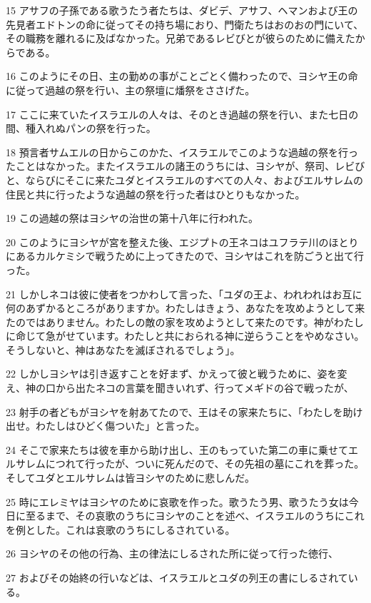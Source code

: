 \par 15 アサフの子孫である歌うたう者たちは、ダビデ、アサフ、ヘマンおよび王の先見者エドトンの命に従ってその持ち場におり、門衛たちはおのおの門にいて、その職務を離れるに及ばなかった。兄弟であるレビびとが彼らのために備えたからである。
\par 16 このようにその日、主の勤めの事がことごとく備わったので、ヨシヤ王の命に従って過越の祭を行い、主の祭壇に燔祭をささげた。
\par 17 ここに来ていたイスラエルの人々は、そのとき過越の祭を行い、また七日の間、種入れぬパンの祭を行った。
\par 18 預言者サムエルの日からこのかた、イスラエルでこのような過越の祭を行ったことはなかった。またイスラエルの諸王のうちには、ヨシヤが、祭司、レビびと、ならびにそこに来たユダとイスラエルのすべての人々、およびエルサレムの住民と共に行ったような過越の祭を行った者はひとりもなかった。
\par 19 この過越の祭はヨシヤの治世の第十八年に行われた。
\par 20 このようにヨシヤが宮を整えた後、エジプトの王ネコはユフラテ川のほとりにあるカルケミシで戦うために上ってきたので、ヨシヤはこれを防ごうと出て行った。
\par 21 しかしネコは彼に使者をつかわして言った、「ユダの王よ、われわれはお互に何のあずかるところがありますか。わたしはきょう、あなたを攻めようとして来たのではありません。わたしの敵の家を攻めようとして来たのです。神がわたしに命じて急がせています。わたしと共におられる神に逆らうことをやめなさい。そうしないと、神はあなたを滅ぼされるでしょう」。
\par 22 しかしヨシヤは引き返すことを好まず、かえって彼と戦うために、姿を変え、神の口から出たネコの言葉を聞きいれず、行ってメギドの谷で戦ったが、
\par 23 射手の者どもがヨシヤを射あてたので、王はその家来たちに、「わたしを助け出せ。わたしはひどく傷ついた」と言った。
\par 24 そこで家来たちは彼を車から助け出し、王のもっていた第二の車に乗せてエルサレムにつれて行ったが、ついに死んだので、その先祖の墓にこれを葬った。そしてユダとエルサレムは皆ヨシヤのために悲しんだ。
\par 25 時にエレミヤはヨシヤのために哀歌を作った。歌うたう男、歌うたう女は今日に至るまで、その哀歌のうちにヨシヤのことを述べ、イスラエルのうちにこれを例とした。これは哀歌のうちにしるされている。
\par 26 ヨシヤのその他の行為、主の律法にしるされた所に従って行った徳行、
\par 27 およびその始終の行いなどは、イスラエルとユダの列王の書にしるされている。

